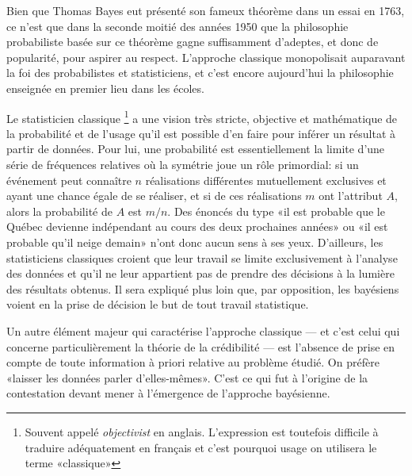 Bien que Thomas Bayes eut présenté son fameux théorème dans un essai
en 1763, ce n'est que dans la seconde moitié des années 1950 que la
philosophie probabiliste basée sur ce théorème gagne suffisamment
d'adeptes, et donc de popularité, pour aspirer au respect. L'approche
classique monopolisait auparavant la foi des probabilistes et
statisticiens, et c'est encore aujourd'hui la philosophie enseignée en
premier lieu dans les écoles.

Le statisticien classique%
\footnote{Souvent appelé \emph{objectivist} en anglais. L'expression
  est toutefois difficile à traduire adéquatement en français et c'est
  pourquoi usage on utilisera le terme «classique»} %
a une vision très stricte, objective et mathématique de la probabilité
et de l'usage qu'il est possible d'en faire pour inférer un résultat à
partir de données. Pour lui, une probabilité est essentiellement la
limite d'une série de fréquences relatives où la symétrie joue un rôle
primordial: si un événement peut connaître $n$ réalisations
différentes mutuellement exclusives et ayant une chance égale de se
réaliser, et si de ces réalisations $m$ ont l'attribut $A$, alors la
probabilité de $A$ est $m/n$. Des énoncés du type «il est probable que
le Québec devienne indépendant au cours des deux prochaines années» ou
«il est probable qu'il neige demain» n'ont donc aucun sens à ses yeux.
D'ailleurs, les statisticiens classiques croient que leur travail se
limite exclusivement à l'analyse des données et qu'il ne leur
appartient pas de prendre des décisions à la lumière des résultats
obtenus. Il sera expliqué plus loin que, par opposition, les bayésiens
voient en la prise de décision le but de tout travail statistique.

Un autre élément majeur qui caractérise l'approche classique --- et
c'est celui qui concerne particulièrement la théorie de la crédibilité
--- est l'absence de prise en compte de toute information à priori
relative au problème étudié. On préfère «laisser les données parler
d'elles-mêmes». C'est ce qui fut à l'origine de la contestation devant
mener à l'émergence de l'approche bayésienne.

